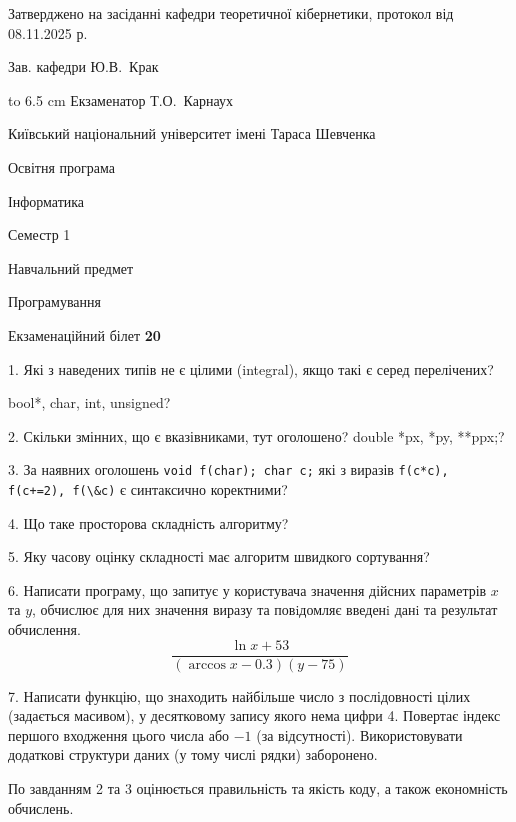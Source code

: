 \documentclass[12pt, ukrainian]{article}
\def\code#1{\Verb!#1!}
\begin{document}
{\smallskip\smallskip \begin {scriptsize} Затверджено на засіданні кафедри теоретичної кібернетики, протокол   від   08.11.2025 р.\par\smallskip\smallskip\smallskip\smallskip
{\parbox {6.5 cm} {Зав. кафедри \dotfill Ю.В.~Крак}}\hspace {0.7cm} {\hbox to 6.5 cm { Екзаменатор \dotfill Т.О.~Карнаух}} \end{scriptsize}}
\vspace{0.9cm}
{{\begin {scriptsize}\par
{ \center  Київський національний університет імені Тараса Шевченка \par}
{\parbox {5 cm}{Освітня програма \hfill}{\parbox {7 cm}{Інформатика\hfill}}\parbox {6 cm}{\hfill Семестр 1}}\par
{\parbox {5 cm} {Навчальний предмет \hfill}\parbox {7 cm}{Програмування \hfill}\parbox {6cm}{\hfill}\par}\vspace{-15pt} \end{scriptsize}}{\center Екзаменаційний білет \No \textbf { 20 }\par}}
{%
1. Які з наведених типів не є цілими (integral), якщо такі є серед перелічених?

bool*, char, int, unsigned?
\par
\vspace{2mm}
2. Скільки змінних, що є вказівниками, тут оголошено?
double *px, *py, **ppx;?
\par
\vspace{2mm}
3. За наявних оголошень \code{void f(char); char c;} які з виразів \code{f(c*c), f(c+=2), f(\&c)} є синтаксично коректними?
\par
\vspace{2mm}
4. Що таке просторова складність алгоритму?
\par
\vspace{2mm}
5. Яку часову оцінку складності має алгоритм швидкого сортування?
\par
\vspace{2mm}
6. Написати програму, що запитує у користувача значення дійсних параметрів $x$ та $y$, обчислює для них значення виразу та повiдомляє введенi данi та результат обчислення.
$$\frac{\ln x + 53}{(\arccos x - 0.3) (y - 75)}$$ 

\par
7. Написати функцію, що знаходить найбільше число з послідовності цілих (задається масивом), у десятковому запису якого нема цифри 4. Повертає індекс першого входження цього числа або $-1$ (за відсутності). Використовувати додаткові структури даних (у тому числі рядки) заборонено.

По завданням 2 та 3 оцінюється правильність та якість коду, а також економність обчислень.

}
\end{document}
